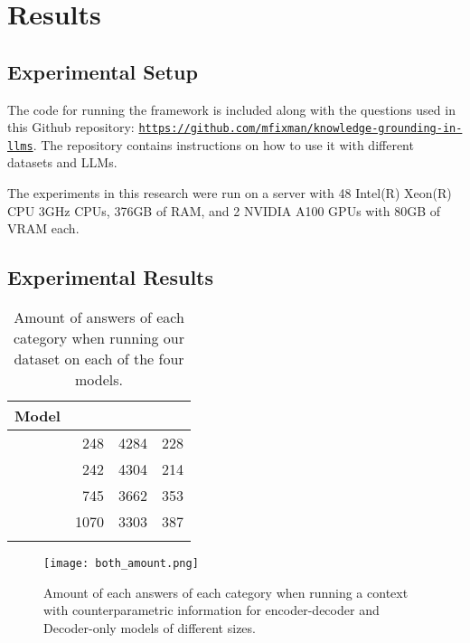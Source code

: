 \section{Results}
\label{results_section}

\subsection{Experimental Setup}

The code for running the framework is included along with the questions used in this Github repository: \texttt{\url{https://github.com/mfixman/knowledge-grounding-in-llms}}.
The repository contains instructions on how to use it with different datasets and LLMs.

The experiments in this research were run on a server with 48 Intel(R) Xeon(R) CPU 3GHz CPUs, 376GB of RAM, and 2 NVIDIA A100 GPUs with 80GB of VRAM each. 

\subsection{Experimental Results}

\begin{table}[t]
	\caption{Amount of answers of each category when running our dataset on each of the four models.}
	\label{total_table}
	\centering
	\footnotesize
	\begin{tabular}{l r r r}
		\toprule
			\bfseries Model & \Pc{} & \Cc{} & \Oc{} \\
		\midrule
			\smallflan{}  & 248 & 4284 & 228 \\
			\bigflan{} & 242 & 4304 & 214 \\
		\midrule
			\smallllama{} & 745 & 3662 & 353 \\
			\bigllama{} & 1070 & 3303 & 387 \\
		\bottomrule \addlinespace[4pt]
	\end{tabular}
\end{table}

\begin{figure}[t]
	\centering
	\texttt{[image: both\_amount.png]}
	\caption{Amount of each answers of each category when running a context with counterparametric information for encoder-decoder and Decoder-only models of different sizes.}
	\label{total_plot}
\end{figure}

